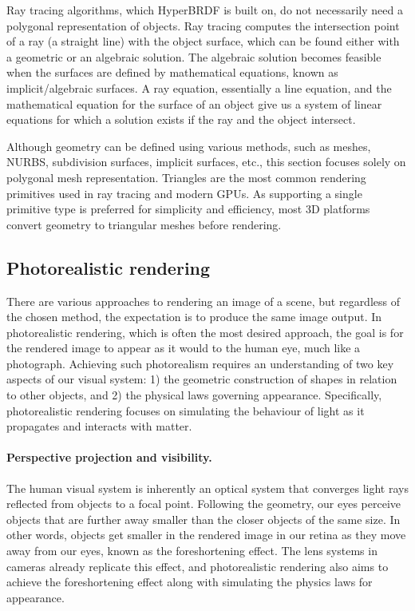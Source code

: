 Ray tracing algorithms, which HyperBRDF is built on, do not necessarily need a polygonal representation of objects. Ray tracing computes the intersection point of a ray (a straight line) with the object surface, which can be found either with a geometric or an algebraic solution. The algebraic solution becomes feasible when the surfaces are defined by mathematical equations, known as implicit/algebraic surfaces. A ray equation, essentially a line equation, and the mathematical equation for the surface of an object give us a system of linear equations for which a solution exists if the ray and the object intersect.

Although geometry can be defined using various methods, such as meshes, NURBS, subdivision surfaces, implicit surfaces, etc., this section focuses solely on polygonal mesh representation. Triangles are the most common rendering primitives used in ray tracing and modern GPUs. As supporting a single primitive type is preferred for simplicity and efficiency, most 3D platforms convert geometry to triangular meshes before rendering.
 
\subsection{Photorealistic rendering}
There are various approaches to rendering an image of a scene, but regardless of the chosen method, the expectation is to produce the same image output. In photorealistic rendering, which is often the most desired approach, the goal is for the rendered image to appear as it would to the human eye, much like a photograph. Achieving such photorealism requires an understanding of two key aspects of our visual system: 1) the geometric construction of shapes in relation to other objects, and 2) the physical laws governing appearance. Specifically, photorealistic rendering focuses on simulating the behaviour of light as it propagates and interacts with matter.

\paragraph{Perspective projection and visibility.}

The human visual system is inherently an optical system that converges light rays reflected from objects to a focal point. Following the geometry, our eyes perceive objects that are further away smaller than the closer objects of the same size. In other words, objects get smaller in the rendered image in our retina as they move away from our eyes, known as the foreshortening effect. The lens systems in cameras already replicate this effect, and photorealistic rendering also aims to achieve the foreshortening effect along with simulating the physics laws for appearance.  

